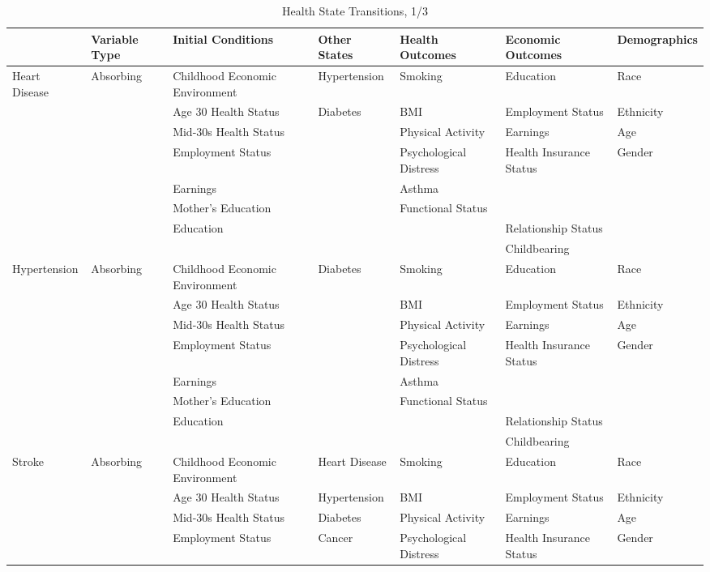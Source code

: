 \begin{table}
\caption{Health State Transitions, 1/3} \label{table:supertab1}
\begin{tiny}
\begin{tabular}{lllllll}
\toprule
& Variable Type & Initial Conditions & Other States & Health Outcomes & Economic Outcomes & Demographics \\
\midrule
Heart Disease & Absorbing & Childhood Economic Environment & Hypertension & Smoking & Education & Race \\
			&& Age 30 Health Status & Diabetes & BMI & Employment Status & Ethnicity \\
			&& Mid-30s Health Status & & Physical Activity & Earnings & Age \\
			&& Employment Status &  &  Psychological Distress  &  Health Insurance Status& Gender \\
			&&  Earnings & &  Asthma &  & \\
			&& Mother's Education &  & Functional Status &  & \\
			&& Education& &  & Relationship Status & \\
			&& & & & Childbearing & \\
\midrule			
Hypertension & Absorbing & Childhood Economic Environment & Diabetes & Smoking & Education & Race \\
			&& Age 30 Health Status &  & BMI & Employment Status & Ethnicity \\
			&&  Mid-30s Health Status & & Physical Activity & Earnings & Age \\
			&& Employment Status & &  Psychological Distress & Health Insurance Status & Gender \\
			&& Earnings  & &  Asthma &  & \\
			&& Mother's Education  & & Functional Status &  & \\
			&& Education & &  & Relationship Status  & \\
			&& & & & Childbearing & \\
\midrule			
Stroke & Absorbing & Childhood Economic Environment & Heart Disease & Smoking & Education & Race \\
			&& Age 30 Health Status & Hypertension & BMI & Employment Status & Ethnicity \\
			&& Mid-30s Health Status & Diabetes &  Physical Activity & Earnings & Age \\
			&& Employment Status & Cancer & Psychological Distress & Health Insurance Status & Gender \\

\end{tabular}
\end{tiny}
\end{table}
